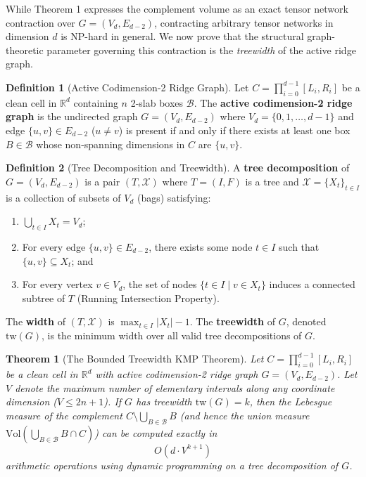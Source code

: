 \documentclass[11pt,a4paper]{article}
\theoremstyle{plain}
\newtheorem{theorem}{Theorem}
\theoremstyle{definition}
\newtheorem{definition}{Definition}
\begin{document}
While Theorem 1 expresses the complement volume as an exact tensor network contraction over $G = (V_d, E_{d-2})$, contracting arbitrary tensor networks in dimension $d$ is NP-hard in general. We now prove that the structural graph-theoretic parameter governing this contraction is the \emph{treewidth} of the active ridge graph.

\begin{definition}[Active Codimension-2 Ridge Graph]
Let $C = \prod_{i=0}^{d-1} [L_i, R_i]$ be a clean cell in $\mathbb{R}^d$ containing $n$ 2-slab boxes $\mathcal{B}$. The \textbf{active codimension-2 ridge graph} is the undirected graph $G = (V_d, E_{d-2})$ where $V_d = \{0, 1, \dots, d-1\}$ and edge $\{u, v\} \in E_{d-2}$ ($u \ne v$) is present if and only if there exists at least one box $B \in \mathcal{B}$ whose non-spanning dimensions in $C$ are $\{u, v\}$.
\end{definition}

\begin{definition}[Tree Decomposition and Treewidth]
A \textbf{tree decomposition} of $G = (V_d, E_{d-2})$ is a pair $(T, \mathcal{X})$ where $T = (I, F)$ is a tree and $\mathcal{X} = \{X_t\}_{t \in I}$ is a collection of subsets of $V_d$ (bags) satisfying:
\begin{enumerate}
    \item $\bigcup_{t \in I} X_t = V_d$;
    \item For every edge $\{u, v\} \in E_{d-2}$, there exists some node $t \in I$ such that $\{u, v\} \subseteq X_t$; and
    \item For every vertex $v \in V_d$, the set of nodes $\{t \in I \mid v \in X_t\}$ induces a connected subtree of $T$ (Running Intersection Property).
\end{enumerate}
The \textbf{width} of $(T, \mathcal{X})$ is $\max_{t \in I} |X_t| - 1$. The \textbf{treewidth} of $G$, denoted $\mathrm{tw}(G)$, is the minimum width over all valid tree decompositions of $G$.
\end{definition}

\begin{theorem}[The Bounded Treewidth KMP Theorem]
\label{thm:bounded_treewidth}
Let $C = \prod_{i=0}^{d-1} [L_i, R_i]$ be a clean cell in $\mathbb{R}^d$ with active codimension-2 ridge graph $G = (V_d, E_{d-2})$. Let $V$ denote the maximum number of elementary intervals along any coordinate dimension ($V \le 2n + 1$).
If $G$ has treewidth $\mathrm{tw}(G) = k$, then the Lebesgue measure of the complement $C \setminus \bigcup_{B \in \mathcal{B}} B$ (and hence the union measure $\mathrm{Vol}(\bigcup_{B \in \mathcal{B}} B \cap C)$) can be computed exactly in
\begin{equation}
O\left(d \cdot V^{k+1}\right)
\end{equation}
arithmetic operations using dynamic programming on a tree decomposition of $G$.
\end{theorem}
\end{document}
